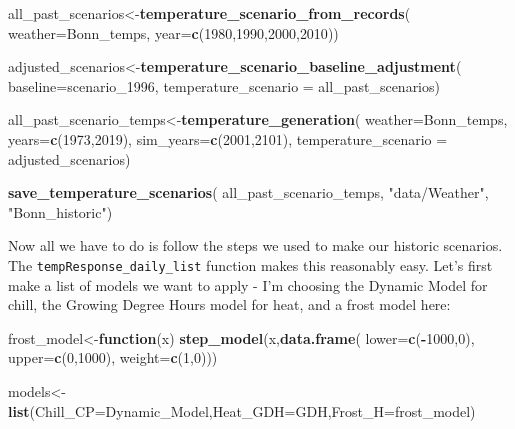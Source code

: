 \documentclass[
]{book}
\newenvironment{Shaded}{\begin{snugshade}}{\end{snugshade}}
\newcommand{\ControlFlowTok}[1]{\textcolor[rgb]{0.13,0.29,0.53}{\textbf{#1}}}
\newcommand{\DataTypeTok}[1]{\textcolor[rgb]{0.13,0.29,0.53}{#1}}
\newcommand{\DecValTok}[1]{\textcolor[rgb]{0.00,0.00,0.81}{#1}}
\newcommand{\KeywordTok}[1]{\textcolor[rgb]{0.13,0.29,0.53}{\textbf{#1}}}
\newcommand{\NormalTok}[1]{#1}
\newcommand{\OperatorTok}[1]{\textcolor[rgb]{0.81,0.36,0.00}{\textbf{#1}}}
\newcommand{\StringTok}[1]{\textcolor[rgb]{0.31,0.60,0.02}{#1}}
\begin{document}
\begin{Shaded}
\begin{Highlighting}[]
\NormalTok{all_past_scenarios<-}\KeywordTok{temperature_scenario_from_records}\NormalTok{(}
  \DataTypeTok{weather=}\NormalTok{Bonn_temps,}
  \DataTypeTok{year=}\KeywordTok{c}\NormalTok{(}\DecValTok{1980}\NormalTok{,}\DecValTok{1990}\NormalTok{,}\DecValTok{2000}\NormalTok{,}\DecValTok{2010}\NormalTok{))}

\NormalTok{adjusted_scenarios<-}\KeywordTok{temperature_scenario_baseline_adjustment}\NormalTok{(}
  \DataTypeTok{baseline=}\NormalTok{scenario_}\DecValTok{1996}\NormalTok{,}
  \DataTypeTok{temperature_scenario =}\NormalTok{ all_past_scenarios)}

\NormalTok{all_past_scenario_temps<-}\KeywordTok{temperature_generation}\NormalTok{(}
  \DataTypeTok{weather=}\NormalTok{Bonn_temps,}
  \DataTypeTok{years=}\KeywordTok{c}\NormalTok{(}\DecValTok{1973}\NormalTok{,}\DecValTok{2019}\NormalTok{),}
  \DataTypeTok{sim_years=}\KeywordTok{c}\NormalTok{(}\DecValTok{2001}\NormalTok{,}\DecValTok{2101}\NormalTok{),}
  \DataTypeTok{temperature_scenario =}\NormalTok{ adjusted_scenarios)}

\KeywordTok{save_temperature_scenarios}\NormalTok{(}
\NormalTok{  all_past_scenario_temps,}
  \StringTok{"data/Weather"}\NormalTok{,}
  \StringTok{"Bonn_historic"}\NormalTok{)}
\end{Highlighting}
\end{Shaded}

Now all we have to do is follow the steps we used to make our historic scenarios. The \texttt{tempResponse\_daily\_list} function makes this reasonably easy. Let's first make a list of models we want to apply - I'm choosing the Dynamic Model for chill, the Growing Degree Hours model for heat, and a frost model here:

\begin{Shaded}
\begin{Highlighting}[]
\NormalTok{frost_model<-}\ControlFlowTok{function}\NormalTok{(x) }\KeywordTok{step_model}\NormalTok{(x,}\KeywordTok{data.frame}\NormalTok{(}
  \DataTypeTok{lower=}\KeywordTok{c}\NormalTok{(}\OperatorTok{-}\DecValTok{1000}\NormalTok{,}\DecValTok{0}\NormalTok{),}
  \DataTypeTok{upper=}\KeywordTok{c}\NormalTok{(}\DecValTok{0}\NormalTok{,}\DecValTok{1000}\NormalTok{),}
  \DataTypeTok{weight=}\KeywordTok{c}\NormalTok{(}\DecValTok{1}\NormalTok{,}\DecValTok{0}\NormalTok{)))}

\NormalTok{models<-}\KeywordTok{list}\NormalTok{(}\DataTypeTok{Chill_CP=}\NormalTok{Dynamic_Model,}\DataTypeTok{Heat_GDH=}\NormalTok{GDH,}\DataTypeTok{Frost_H=}\NormalTok{frost_model)}
\end{Highlighting}
\end{Shaded}
\end{document}
